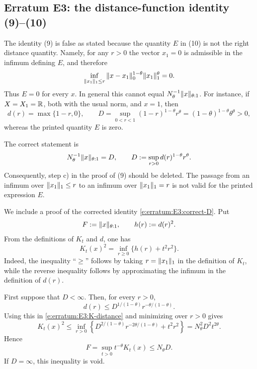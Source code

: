 
\subsection*{Erratum E3: the distance-function identity (9)--(10)}
\label{s:erratum:E3}

The identity (9) is false as stated because the quantity $E$ in
(10) is not the right distance quantity.  Namely,
for any $r>0$ the vector $x_1=0$ is admissible in the infimum defining $E$,
and therefore
\[
	\inf_{\| x_1 \|_{ 1 }\leq r}
	\| x-x_1 \|_{ 0 }^{1-\theta}\| x_1 \|_{ 1 }^{\theta}
	=0 .
\]
Thus $E=0$ for every $x$.  In general this cannot equal
$N_\theta^{-1}\| x \|_{ \theta:1 }$.  For instance, if $X=X_1=\mathbb{R}$, both with
the usual norm, and $x=1$, then
\[
	d(r)=\max\{1-r,0\},
	\qquad
	D=\sup_{0<r<1}(1-r)^{1-\theta}r^\theta
	=(1-\theta)^{1-\theta}\theta^\theta>0,
\]
whereas the printed quantity $E$ is zero.

The correct statement is
\begin{equation}
	N_\theta^{-1}\| x \|_{ \theta:1 }
	=
	D,
	\qquad
	D:=\sup_{r>0}d(r)^{1-\theta}r^\theta .
	\label{e:erratum:E3:correct-D}
\end{equation}
Consequently, step c) in the proof of (9) should be deleted.  The
passage from an infimum over $\| x_1 \|_{ 1 }\leq r$ to an infimum over
$\| x_1 \|_{ 1 }=r$ is not valid for the printed expression $E$.

We include a proof of the corrected identity \eqref{e:erratum:E3:correct-D}.
Put
\[
	F:=\| x \|_{ \theta:1 },
	\qquad
	h(r):=d(r)^2 .
\]
From the definitions of $K_t$ and $d$, one has
\begin{equation}
	K_t(x)^2
	=
	\inf_{r\geq0}\{h(r)+t^2r^2\} .
	\label{e:erratum:E3:K-distance}
\end{equation}
Indeed, the inequality ``$\geq$'' follows by taking
$r=\| x_1 \|_{ 1 }$ in the definition of $K_t$, while the reverse inequality
follows by approximating the infimum in the definition of $d(r)$.

First suppose that $D<\infty$.  Then, for every $r>0$,
\[
	d(r)\leq D^{1/(1-\theta)} r^{-\theta/(1-\theta)} .
\]
Using this in \eqref{e:erratum:E3:K-distance} and minimizing over $r>0$ gives
\[
	K_t(x)^2
	\leq
	\inf_{r>0}
	\left\{
	D^{2/(1-\theta)}r^{-2\theta/(1-\theta)}+t^2r^2
	\right\}
	=
	N_\theta^2D^2t^{2\theta} .
\]
Hence
\[
	F=\sup_{t>0}t^{-\theta}K_t(x)\leq N_\theta D .
\]
If $D=\infty$, this inequality is void.

